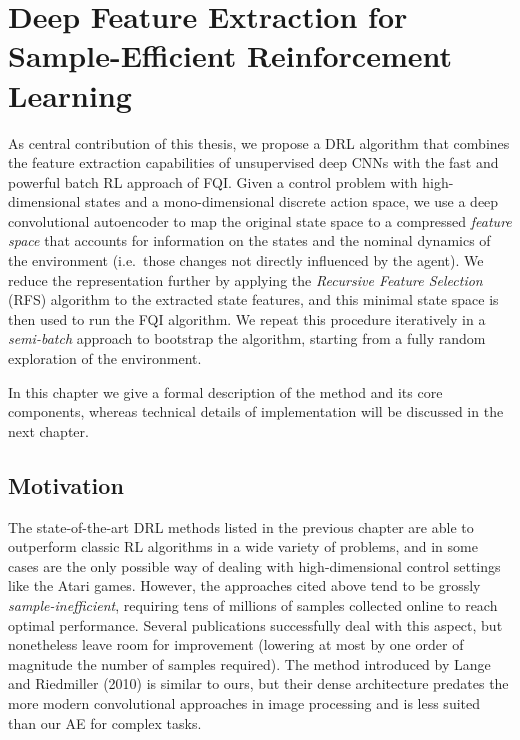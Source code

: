 \chapter{Deep Feature Extraction for Sample-Efficient Reinforcement Learning}
\label{chapter4_research_problem}
\thispagestyle{empty}

\vspace{0.5cm}

As central contribution of this thesis, we propose a DRL algorithm that 
combines the feature extraction capabilities of unsupervised deep CNNs with the 
fast and powerful batch RL approach of FQI. 
Given a control problem with high-dimensional states and a mono-dimensional 
discrete action space, we use a deep convolutional autoencoder to map the 
original state space to a compressed \textit{feature space} that accounts for 
information on the states and the nominal dynamics of the environment (i.e.\ 
those changes not directly influenced by the agent). 
We reduce the representation further by applying the \textit{Recursive Feature
Selection} (RFS) algorithm to the extracted state features, and this minimal 
state space is then used to run the FQI algorithm. 
We repeat this procedure iteratively in a \textit{semi-batch} approach to 
bootstrap the algorithm, starting from a fully random exploration of the 
environment.

In this chapter we give a formal description of the method and its core 
components, whereas technical details of implementation will be discussed in the 
next chapter.

\section{Motivation}
The state-of-the-art DRL methods listed in the previous chapter are able to 
outperform classic RL algorithms in a wide variety of problems, and in some 
cases are the only possible way of dealing with high-dimensional control 
settings like the Atari games. 
However, the approaches cited above tend to be grossly 
\textit{sample-inefficient}, requiring tens of millions of samples collected
online to reach optimal performance. Several publications successfully deal 
with this aspect, but nonetheless leave room for improvement (lowering at most
by one order of magnitude the number of samples required).
The method introduced by Lange and Riedmiller (2010) \cite{lange2010deep} is 
similar to ours, but their dense architecture predates the more modern 
convolutional approaches in image processing and is less suited than our AE for 
complex tasks.


